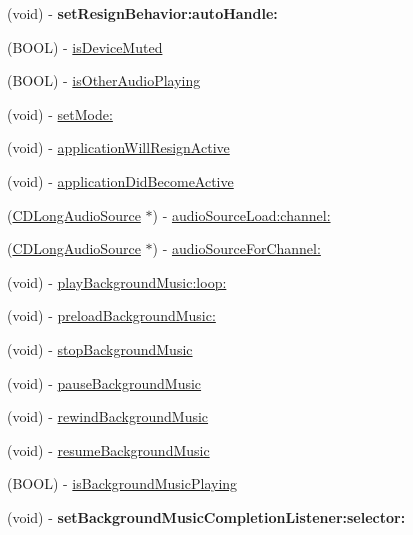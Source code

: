 \begin{DoxyCompactItemize}
(void) -\/ {\bfseries set\+Resign\+Behavior\+:auto\+Handle\+:}
\item 
(B\+O\+OL) -\/ \hyperlink{interfaceCDAudioManager_a5a4df8bc83cbc6e6723196d3d4ec4974}{is\+Device\+Muted}
\item 
(B\+O\+OL) -\/ \hyperlink{interfaceCDAudioManager_ab664b34e99f6f3e2158f2df910cf3a95}{is\+Other\+Audio\+Playing}
\item 
(void) -\/ \hyperlink{interfaceCDAudioManager_a72fd182d62cc75dfa3701da4a5d97346}{set\+Mode\+:}
\item 
(void) -\/ \hyperlink{interfaceCDAudioManager_a5265cc9a823688a547aa60e8995ba423}{application\+Will\+Resign\+Active}
\item 
(void) -\/ \hyperlink{interfaceCDAudioManager_aa572c7a296c0b2de3564f8da368835ef}{application\+Did\+Become\+Active}
\item 
(\hyperlink{interfaceCDLongAudioSource}{C\+D\+Long\+Audio\+Source} $\ast$) -\/ \hyperlink{interfaceCDAudioManager_a34c37890b0e9b8995230d1bdc9afa5a7}{audio\+Source\+Load\+:channel\+:}
\item 
(\hyperlink{interfaceCDLongAudioSource}{C\+D\+Long\+Audio\+Source} $\ast$) -\/ \hyperlink{interfaceCDAudioManager_a07f9dbc2d03a610a187675c6cfb24893}{audio\+Source\+For\+Channel\+:}
\item 
(void) -\/ \hyperlink{interfaceCDAudioManager_a940bfd555f763ee56217b6d589cb6a30}{play\+Background\+Music\+:loop\+:}
\item 
(void) -\/ \hyperlink{interfaceCDAudioManager_a613d13a6227a90dd5a073dbde1ac447b}{preload\+Background\+Music\+:}
\item 
(void) -\/ \hyperlink{interfaceCDAudioManager_a2403abdc32f144a0d57d915db42d35a6}{stop\+Background\+Music}
\item 
(void) -\/ \hyperlink{interfaceCDAudioManager_acbd505494ec2f01e484dfca635b208b8}{pause\+Background\+Music}
\item 
(void) -\/ \hyperlink{interfaceCDAudioManager_a98e99a2b9eabcf89ad7419f6f809c65a}{rewind\+Background\+Music}
\item 
(void) -\/ \hyperlink{interfaceCDAudioManager_a9bcc620677df7b828dd69c951b445062}{resume\+Background\+Music}
\item 
(B\+O\+OL) -\/ \hyperlink{interfaceCDAudioManager_a3b519950dee5dd8e79c8bbbf3c0f7e26}{is\+Background\+Music\+Playing}
\item 
\mbox{\label{interfaceCDAudioManager_ae333be8046b55eabda5cd6ffbf1ecf9b}} 
(void) -\/ {\bfseries set\+Background\+Music\+Completion\+Listener\+:selector\+:}

\end{DoxyCompactItemize}

